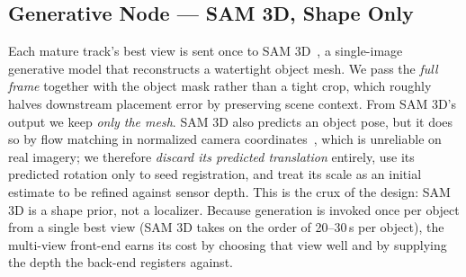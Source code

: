 \documentclass[conference]{IEEEtran}
\begin{document}
\subsection{Generative Node --- SAM 3D, Shape Only}
\label{sec:node}
Each mature track's best view is sent once to SAM 3D~\cite{sam3d}, a single-image
generative model that reconstructs a watertight object mesh. We pass the
\emph{full frame} together with the object mask rather than a tight crop, which
roughly halves downstream placement error by preserving scene context. From
SAM 3D's output we keep \emph{only the mesh}. SAM 3D also predicts an object
pose, but it does so by flow matching in normalized camera
coordinates~\cite{flowmatching}, which is unreliable on real imagery; we therefore
\emph{discard its predicted translation} entirely, use its predicted rotation
only to seed registration, and treat its scale as an initial estimate to be
refined against sensor depth. This is the crux of the design: SAM 3D is a shape
prior, not a localizer. Because generation is invoked once per object from a
single best view (SAM 3D takes on the order of 20--30\,s per object), the
multi-view front-end earns its cost by choosing that view well and by supplying
the depth the back-end registers against.
\end{document}
